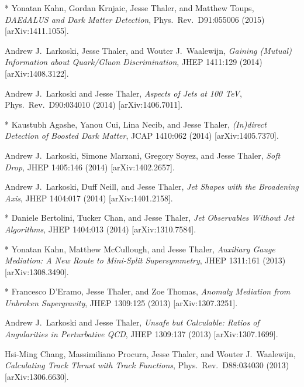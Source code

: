 \begin{list}{[]\addtocounter{jessecount}{-1}}{\leftmargin=3em \itemsep=4pt}
\item
* Yonatan Kahn, Gordan Krnjaic, Jesse Thaler, and Matthew Toups,
\emph{DAEdALUS and Dark Matter Detection},
Phys.\ Rev.\ D91:055006 (2015)
[arXiv:1411.1055].

\item
 Andrew J.\ Larkoski, Jesse Thaler, and Wouter J.\ Waalewijn,
\emph{Gaining (Mutual) Information about Quark/Gluon Discrimination},
JHEP 1411:129 (2014)
[arXiv:1408.3122].

\item
 Andrew J.\ Larkoski and Jesse Thaler,
\emph{Aspects of Jets at 100 TeV},
Phys.\ Rev.\ D90:034010 (2014)
[arXiv:1406.7011].

\item
* Kaustubh Agashe, Yanou Cui, Lina Necib, and Jesse Thaler,
\emph{(In)direct Detection of Boosted Dark Matter},
JCAP 1410:062 (2014)
[arXiv:1405.7370].

\item
 Andrew J.\ Larkoski, Simone Marzani, Gregory Soyez, and Jesse Thaler,
\emph{Soft Drop},
JHEP 1405:146 (2014)
[arXiv:1402.2657].

\item
 Andrew J.\ Larkoski, Duff Neill, and Jesse Thaler,
\emph{Jet Shapes with the Broadening Axis},
JHEP 1404:017 (2014)
[arXiv:1401.2158].

\item
* Daniele Bertolini, Tucker Chan, and Jesse Thaler,
\emph{Jet Observables Without Jet Algorithms},
JHEP 1404:013 (2014)
[arXiv:1310.7584].

\item
* Yonatan Kahn, Matthew McCullough, and Jesse Thaler,
\emph{Auxiliary Gauge Mediation: A New Route to Mini-Split Supersymmetry},
JHEP 1311:161 (2013)
[arXiv:1308.3490].

\item
* Francesco D'Eramo, Jesse Thaler, and Zoe Thomas,
\emph{Anomaly Mediation from Unbroken Supergravity},
JHEP 1309:125 (2013)
[arXiv:1307.3251].

\item
 Andrew J.\ Larkoski and Jesse Thaler,
\emph{Unsafe but Calculable: Ratios of Angularities in Perturbative QCD},
JHEP 1309:137 (2013)
[arXiv:1307.1699].

\item
 Hsi-Ming Chang, Massimiliano Procura, Jesse Thaler, and Wouter J.\ Waalewijn,
\emph{Calculating Track Thrust with Track Functions},
Phys.\ Rev.\ D88:034030 (2013)
[arXiv:1306.6630].


\end{list}
